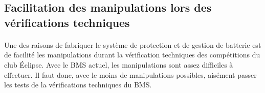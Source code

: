 	\subsection{Facilitation des manipulations lors des vérifications techniques}

		\paragraph{}
		Une des raisons de fabriquer le système de protection et de gestion de batterie est de facilité les manipulations durant la vérification techniques des compétitions du club Éclipse. Avec le BMS actuel, les manipulations sont assez difficiles à effectuer. Il faut donc, avec le moins de manipulations possibles, aisément passer les tests de la vérifications techniques du BMS.

